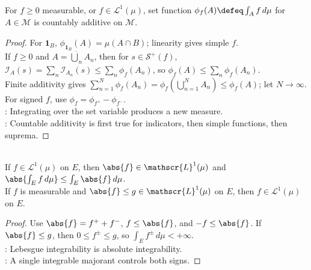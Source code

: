 \begin{theorem} \label{thm:integral-countably-additive-set-function} \\
For $f\geq0$ measurable, or $f\in\mathscr{L}^1(\mu)$, set function $\phi_f(A)\defeq\int_A f\,d\mu$ for $A\in\mathcal{M}$ is countably additive on $\mathcal{M}$.
\begin{proof}
For $\mathbf{1}_B$, $\phi_{\mathbf{1}_B}(A)=\mu(A\cap B)$; linearity gives simple $f$.\\
If $f\geq0$ and $A=\dot\bigcup_nA_n$, then for $s\in\mathcal{S}^+(f)$, $\mathcal{I}_A(s)=\sum\limits_n\mathcal{I}_{A_n}(s)\leq\sum\limits_n\phi_f(A_n)$, so $\phi_f(A)\leq\sum\limits_n\phi_f(A_n)$.\\
Finite additivity gives $\sum\limits_{n=1}^{N}\phi_f(A_n)=\phi_f(\bigcup\limits_{n=1}^{N}A_n)\leq\phi_f(A)$; let $N\to\infty$. For signed $f$, use $\phi_f=\phi_{f^+}-\phi_{f^-}$.\\
: Integrating over the set variable produces a new measure.\\
: Countable additivity is first true for indicators, then simple functions, then suprema.
\end{proof}
\end{theorem}

\begin{theorem} \label{thm:absolute-integrability-and-domination} \\
If $f\in\mathscr{L}^1(\mu)$ on $E$, then $\abs{f}\in\mathscr{L}^1(\mu)$ and $\abs{\int_E f\,d\mu}\leq\int_E\abs{f}\,d\mu$.\\
If $f$ is measurable and $\abs{f}\leq g\in\mathscr{L}^1(\mu)$ on $E$, then $f\in\mathscr{L}^1(\mu)$ on $E$.
\begin{proof}
Use $\abs{f}=f^++f^-$, $f\leq\abs{f}$, and $-f\leq\abs{f}$. If $\abs{f}\leq g$, then $0\leq f^\pm\leq g$, so $\int_Ef^\pm\,d\mu<+\infty$.\\
: Lebesgue integrability is absolute integrability.\\
: A single integrable majorant controls both signs.
\end{proof}
\end{theorem}

